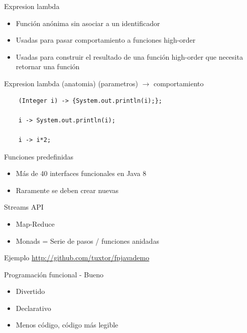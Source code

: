 \documentclass{beamer}
\begin{document}
\begin{frame}{Expresion lambda}
	\begin{itemize}
	\item Función anónima sin asociar a un identificador
	\item Usadas para pasar comportamiento a funciones high-order
	\item Usadas para construir el resultado de una función high-order que necesita retornar una función
	\end{itemize}
\end{frame}

\begin{frame}[fragile]{Expresion lambda (anatomia)}
	(parametros)  $\to$ {comportamiento}
	
	\begin{lstlisting}
	(Integer i) -> {System.out.println(i);};
		
	i -> System.out.println(i);
	    
	i -> i*2;
	\end{lstlisting}
\end{frame}

\begin{frame}{Funciones predefinidas}
	\begin{itemize}
	\item Más de 40 interfaces funcionales en Java 8
	\item Raramente se deben crear nuevas
	\end{itemize}
\end{frame}

\begin{frame}{Streams API}
	\begin{itemize}
	\item Map-Reduce
	\item Monads = Serie de pasos / funciones anidadas
	\end{itemize}
	
\end{frame}

\begin{frame}{Ejemplo}
	\href{http://github.com/tuxtor/fpjavademo}{http://github.com/tuxtor/fpjavademo}
\end{frame}

\begin{frame}{Programación funcional - Bueno}
	\begin{itemize}
	\item Divertido
	\item Declarativo
	\item Menos código, código más legible
	\end{itemize}
\end{frame}
\end{document}
